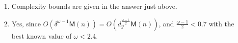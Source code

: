 \documentclass[11pt,a4paper,reqno]{amsart}
\newcommand{\bigO}[1]{O(#1)} %
\newcommand{\timepm}[1]{\mathsf{M}(#1)} %
\begin{document}
\begin{enumerate}
    \begin{itemize}
      \item compute the powers \(P^i \bmod Q\) for \(i<\delta\)  \hfill [total \(\bigO{\delta\timepm{n}}\)]
      \item compute the matrix-vector product, efficiently by expanding the
        vector into a \(\delta \times \delta\) matrix of degree less than
        \(n/\delta\) \hfill [total \(\bigO{\delta^\omega
        \timepm{\frac{n}{\delta} + d_x}}\)]
      \item the previous step has yielded \(\delta\) polynomials of degree less
        than \(n + d_x \in \bigO{n}\) \\
        \(\rightarrow\) reduce them mod \(Q\) \hfill [total \(\bigO{\delta\timepm{n}}\)].
    \end{itemize}

  \item Complexity bounds are given in the answer just above.

  \item Yes, since \(\bigO{\delta^{\omega-1} \timepm{n}} =
    \bigO{d_y^{\frac{\omega-1}{2}} \timepm{n}}\), and \(\frac{\omega-1}{2} <
    0.7\) with the best known value of \(\omega < 2.4\).
\end{enumerate}

\fi
\end{document}

